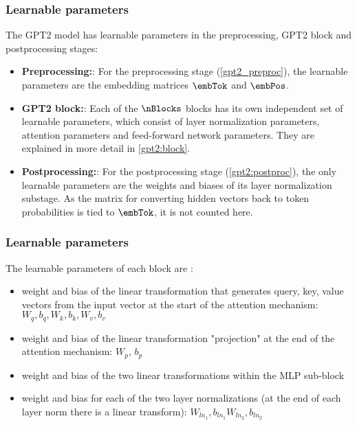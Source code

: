 \subsubsection{Learnable parameters}

The GPT2 model has learnable parameters in the preprocessing, GPT2 block and postprocessing stages:

\begin{itemize}
	\item \textbf{Preprocessing:}: For the preprocessing stage (\cref{gpt2_preproc}), the learnable parameters are the embedding matrices $\embTok$ and $\embPos$.
	\item \textbf{GPT2 block:}: Each of the $\nBlocks$ blocks has its own independent set of learnable parameters, which consist of layer normalization parameters, attention parameters and feed-forward network parameters. They are explained in more detail in \cref{gpt2:block}.
	\item \textbf{Postprocessing:}: For the postprocessing stage (\cref{gpt2:postproc}), the only learnable parameters are the weights and biases of its layer normalization substage. As the matrix for converting hidden vectors back to token probabilities is tied to $\embTok$, it is not counted here.
\end{itemize}





\subsubsection{Learnable parameters}

The learnable parameters of each block are \cite{alammar-gpt2}:

\begin{itemize}
	\item weight and bias of the linear transformation that generates query, key, value vectors from the input vector
	at the start of the attention mechanism: $W_q, b_q, W_k, b_k, W_v, b_v$
	\item weight and bias of the linear transformation "projection" at the end of the attention mechanism: $W_p$, $b_p$
	\item weight and bias of the two linear transformations within the MLP sub-block
	\item weight and bias for each of the two layer normalizations (at the end of each layer norm there is a linear transform): $W_{ln_1}, b_{ln_1} W_{ln_2}, b_{ln_2}$
\end{itemize}